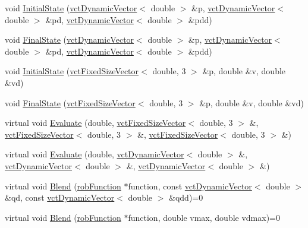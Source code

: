 \begin{DoxyCompactItemize}
\item 
void \hyperlink{classrob_function_rn_aa133ce3c6814498dbfc5388b069b4638}{Initial\+State} (\hyperlink{classvct_dynamic_vector}{vct\+Dynamic\+Vector}$<$ double $>$ \&p, \hyperlink{classvct_dynamic_vector}{vct\+Dynamic\+Vector}$<$ double $>$ \&pd, \hyperlink{classvct_dynamic_vector}{vct\+Dynamic\+Vector}$<$ double $>$ \&pdd)
\item 
void \hyperlink{classrob_function_rn_add7fc00dd53f1db63f16c40a46173537}{Final\+State} (\hyperlink{classvct_dynamic_vector}{vct\+Dynamic\+Vector}$<$ double $>$ \&p, \hyperlink{classvct_dynamic_vector}{vct\+Dynamic\+Vector}$<$ double $>$ \&pd, \hyperlink{classvct_dynamic_vector}{vct\+Dynamic\+Vector}$<$ double $>$ \&pdd)
\item 
void \hyperlink{classrob_function_rn_a381da91aa1d2879f7fdc63cef980bcb8}{Initial\+State} (\hyperlink{classvct_fixed_size_vector}{vct\+Fixed\+Size\+Vector}$<$ double, 3 $>$ \&p, double \&v, double \&vd)
\item 
void \hyperlink{classrob_function_rn_a4609f53c35aa374faada9243541cffca}{Final\+State} (\hyperlink{classvct_fixed_size_vector}{vct\+Fixed\+Size\+Vector}$<$ double, 3 $>$ \&p, double \&v, double \&vd)
\item 
virtual void \hyperlink{classrob_function_rn_a62b0cdb6474fb0ec9ae0e6ce286d3df0}{Evaluate} (double, \hyperlink{classvct_fixed_size_vector}{vct\+Fixed\+Size\+Vector}$<$ double, 3 $>$ \&, \hyperlink{classvct_fixed_size_vector}{vct\+Fixed\+Size\+Vector}$<$ double, 3 $>$ \&, \hyperlink{classvct_fixed_size_vector}{vct\+Fixed\+Size\+Vector}$<$ double, 3 $>$ \&)
\item 
virtual void \hyperlink{classrob_function_rn_a921fc7a6fb6e2ad96631964b7c691ad2}{Evaluate} (double, \hyperlink{classvct_dynamic_vector}{vct\+Dynamic\+Vector}$<$ double $>$ \&, \hyperlink{classvct_dynamic_vector}{vct\+Dynamic\+Vector}$<$ double $>$ \&, \hyperlink{classvct_dynamic_vector}{vct\+Dynamic\+Vector}$<$ double $>$ \&)
\item 
virtual void \hyperlink{classrob_function_rn_a199dc12ec208c84ef820257fa0c1679c}{Blend} (\hyperlink{classrob_function}{rob\+Function} $\ast$function, const \hyperlink{classvct_dynamic_vector}{vct\+Dynamic\+Vector}$<$ double $>$ \&qd, const \hyperlink{classvct_dynamic_vector}{vct\+Dynamic\+Vector}$<$ double $>$ \&qdd)=0
\item 
virtual void \hyperlink{classrob_function_rn_abb99f0170122c5554d3e336e8548c2a7}{Blend} (\hyperlink{classrob_function}{rob\+Function} $\ast$function, double vmax, double vdmax)=0
\end{DoxyCompactItemize}
